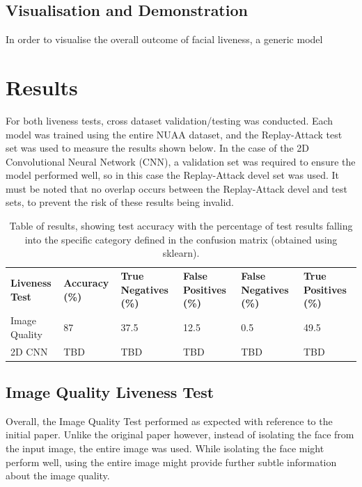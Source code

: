 \documentclass[10pt,a4paper]{article}
\begin{document}
    \subsection{Visualisation and Demonstration}
        In order to visualise the overall outcome of facial liveness, a generic model 
\section{Results}
    For both liveness tests, cross dataset validation/testing was conducted. Each model was trained using the entire NUAA dataset, and the Replay-Attack test set
    was used to measure the results shown below. In the case of the 2D Convolutional Neural Network (CNN), a validation set was required to ensure the model performed
    well, so in this case the Replay-Attack devel set was used. It must be noted that no overlap occurs between the Replay-Attack devel and test sets, to prevent the risk
    of these results being invalid.


    \begin{table}
        \centering
        \begin{tabular}{| l | l | l | l | l | l |}
            \hline
            \textbf{Liveness Test} & \textbf{Accuracy (\%)} & \textbf{True Negatives (\%)} & \textbf{False Positives (\%)} & \textbf{False Negatives (\%)} & \textbf{True Positives (\%)}\\
            Image Quality & 87 & 37.5 & 12.5 & 0.5 & 49.5\\
            2D CNN & TBD & TBD & TBD & TBD & TBD\\
        \end{tabular}
        \label{ResultsTable}
        \caption{Table of results, showing test accuracy with the percentage of test results falling into the specific category defined in the confusion matrix (obtained using sklearn).}
    \end{table}

    \subsection{Image Quality Liveness Test}
        Overall, the Image Quality Test performed as expected with reference to the initial paper. Unlike the original paper however, instead of isolating the face
        from the input image, the entire image was used. While isolating the face might perform well, using the entire image might provide further subtle information
        about the image quality.
\end{document}
